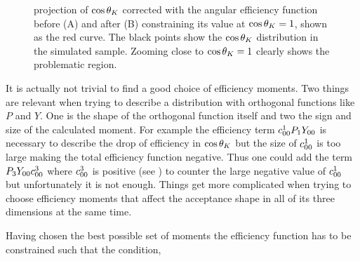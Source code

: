 \begin{figure}[t]
  \centering
  \begin{subfigure}{0.5\textwidth}
    \scalebox{1.15}{}
    \caption{}
    \label{angAcc_nom}
  \end{subfigure}%
  \hfill%
  \begin{subfigure}{0.5\textwidth}
    \scalebox{1.15}{}
    \caption{}
    \label{angAcc_constr_fit}
  \end{subfigure}
  \caption{\pdf projection of $\cos\theta_{K}$ corrected with the angular efficiency function before (A) and after (B)
           constraining its value at $\cos\theta_{K}=1$, shown as the red curve. The black points show the $\cos\theta_{K}$
           distribution in the simulated sample. Zooming close to $\cos\theta_{K}=1$ clearly shows the problematic region.}
  \label{angAcc_constr}
\end{figure}

It is actually not trivial to find a good choice of efficiency moments. Two things are relevant when trying to describe a
distribution with orthogonal functions like $P$ and $Y$. One is the shape of the orthogonal function itself and two the sign and size of the calculated moment.
For example the efficiency term $c^{1}_{00} P_1Y_{00}$ is necessary to describe the drop of efficiency in $\cos\theta_{K}$ but the size of $c^{1}_{00}$
is too large making the total efficiency function negative. Thus one could add the term $P_3Y_{00}c^{3}_{00}$ where $c^{3}_{00}$ is positive
(see  ) to counter the large negative value of $c^{1}_{00}$ but unfortunately it is not enough. Things get more complicated
when trying to choose efficiency moments that affect the acceptance shape in all of its three dimensions at the same time.

Having chosen the best possible set of moments the efficiency function has to be constrained such that the condition,

